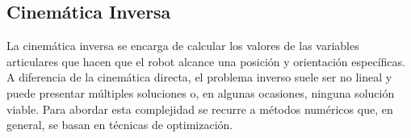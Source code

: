 \subsection{Cinemática Inversa}
La cinemática inversa se encarga de calcular los valores de las variables articulares que hacen que el robot alcance una posición y orientación específicas. A diferencia de la cinemática directa, el problema inverso suele ser no lineal y puede presentar múltiples soluciones o, en algunas ocasiones, ninguna solución viable. Para abordar esta complejidad se recurre a métodos numéricos que, en general, se basan en técnicas de optimización.

